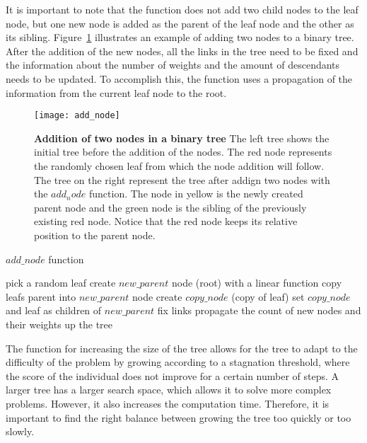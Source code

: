 It is important to note that the function does not add two child nodes to the leaf node, but one new node is added as the parent of the leaf node and the other as its sibling. Figure~\ref{fig:add_node} illustrates an example of adding two nodes to a binary tree. After the addition of the new nodes, all the links in the tree need to be fixed and the information about the number of weights and the amount of descendants needs to be updated. To accomplish this, the function uses a propagation of the information from the current leaf node to the root.
\begin{figure}[!ht]
\centering
\texttt{[image: add\_node]}
\caption[Addition of two nodes in a binary tree]{
  \textbf{Addition of two nodes in a binary tree}
  The left tree shows the initial tree before the addition of the nodes. The red node represents the randomly chosen leaf from which the node addition will follow. The tree on the right represent the tree after addign two nodes with the $add_node$ function. The node in yellow is the newly created parent node and the green node is the sibling of the previously existing red node. Notice that the red node keeps its relative position to the parent node.
 }
\label{fig:add_node}
\end{figure}
\begin{algorithm}
\caption{$add\_node$ function}
\label{add_node function}
\begin{algorithmic}[3]
\State pick a random leaf
    \State create $new\_parent$ node (root) with a linear function
\Else
    \State copy leafs parent into $new\_parent$ node
\EndIf
\State create $copy\_node$ (copy of leaf)
\State set $copy\_node$ and leaf as children of $new\_parent$
\State fix links
\State propagate the count of new nodes and their weights up the tree
\end{algorithmic}
\end{algorithm}

The function for increasing the size of the tree allows for the tree to adapt to the difficulty of the problem by growing according to a stagnation threshold, where the score of the individual does not improve for a certain number of steps. A larger tree has a larger search space, which allows it to solve more complex problems. However, it also increases the computation time. Therefore, it is important to find the right balance between growing the tree too quickly or too slowly.